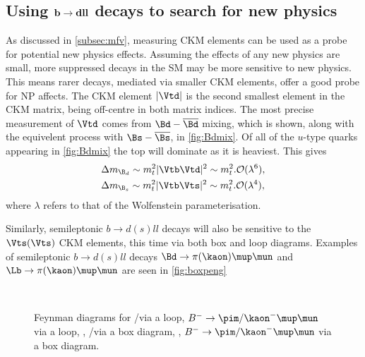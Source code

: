 \subsection{Using $\bf{b\to dll}$ decays to search for new physics}
As discussed in \autoref{subsec:mfv}, measuring  CKM elements can be used as a probe for potential new physics effects. Assuming the effects of any new physics are small, more suppressed decays in the SM may be more sensitive to new physics. This means rarer decays, mediated via smaller CKM elements, offer a good probe for NP affects. The CKM element $|\Vtd|$ is the second smallest element in the CKM matrix, being off-centre in both matrix indices. The most precise measurement of $\Vtd$ comes from $\Bd-\overline{\Bd}$ mixing, which is shown, along with the equivelent process with $\Bs-\overline{\Bs}$, in \autoref{fig:Bdmix}.
Of all of the $u$-type quarks appearing in \autoref{fig:Bdmix} the top will dominate as it is heaviest. This gives
\begin{equation}
  \begin{split}
    & \Delta m_{\B_{d}} \sim m_{t}^{2}|\Vtb\Vtd|^{2} \sim m_{t}^{2}.\mathcal{O}(\lambda^{6}), \\
    & \Delta m_{\B_{s}} \sim m_{t}^{2}|\Vtb\Vts|^{2} \sim m_{t}^{2}.\mathcal{O}(\lambda^{4}),
  \end{split}
\end{equation}
where $\lambda$ refers to that of the Wolfenstein parameterisation.

Similarly, semileptonic $b\to d(s)ll$ decays will also be sensitive to the $\Vts(\Vts)$ CKM elements, this time via both box and loop diagrams. Examples of semileptonic $b\to d(s)ll$ decays $\Bd\to\pi(\kaon)\mup\mun$ and $\Lb\to\pi(\kaon)\mup\mun$ are seen in \autoref{fig:boxpeng}
\begin{figure}[!h]\def\nh{0.5\textwidth}
  \centering
  \hspace*{-1cm}
  \\
  \hspace*{-1cm}
  \caption{Feynman diagrams for \protect{} \Lb\to\proton\pim/\Km\mup\mun via a loop,  \protect{} $B^{-}\to\pim/\kaon^{-}\mup\mun$ via a loop,  \protect{}, \Lb\to\proton\pim/\Km\mup\mun via a box diagram,
   \protect{}, $B^{-}\to\pim/\kaon^{-}\mup\mun$ via a box diagram.
  }
  \label{fig:boxpeng}
\end{figure}


